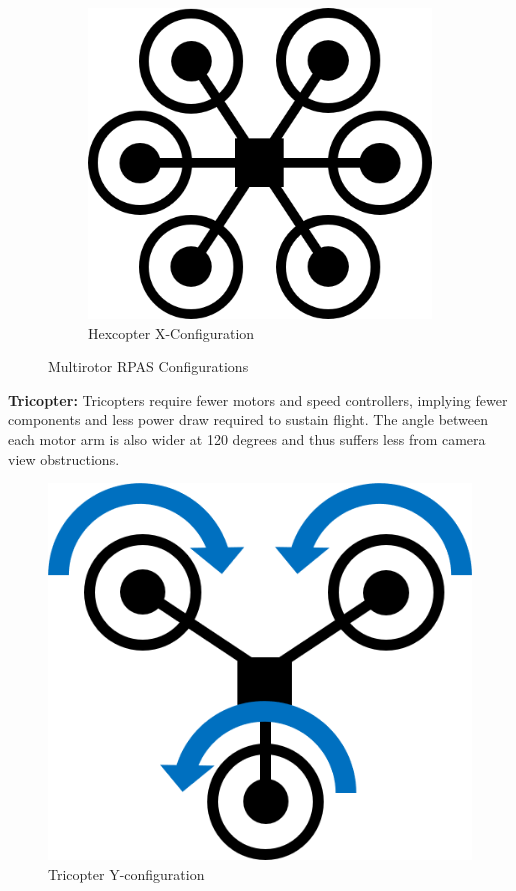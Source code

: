 \begin{figure}[b]
\begin{subfigure}[b]{0.3\textwidth}
        \includegraphics[scale=0.4]{img/drone_hexconfig}
        \caption{Hexcopter X-Configuration}
        \label{fig:hexcopter-x}
    \end{subfigure}
    
    \caption{Multirotor RPAS Configurations}
    \label{fig:rpas-config}
\end{figure}

\textbf{Tricopter:} Tricopters require fewer motors and speed controllers, implying fewer components and less power draw required to sustain flight. The angle between each motor arm is also wider at 120 degrees and thus suffers less from camera view obstructions. 

\begin{figure}[h]
    \centering
    \includegraphics[scale=0.4]{img/drone_yconfigt}
    \caption{Tricopter Y-configuration}
    \label{fig:tricopter-y-t}
\end{figure}

